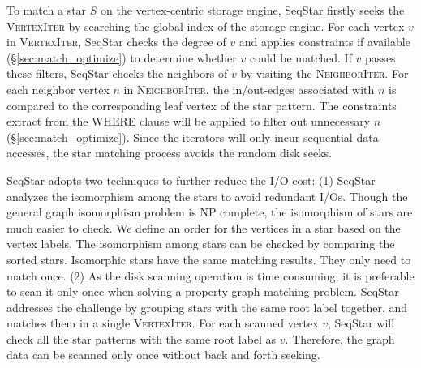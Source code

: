 To match a star $S$ on the vertex-centric storage engine,
SeqStar firstly seeks the \textsc{VertexIter} by searching the global index of the storage engine.
For each vertex $v$ in \textsc{VertexIter},
SeqStar checks the degree of $v$ and applies constraints if available (\S\ref{sec:match_optimize}) to determine whether $v$ could be matched.
If $v$ passes these filters, SeqStar checks the neighbors of $v$ by visiting the \textsc{NeighborIter}.
For each neighbor vertex $n$ in \textsc{NeighborIter},
the in/out-edges associated with $n$ is compared to the corresponding leaf vertex of the star pattern.
The constraints extract from the WHERE clause will be applied to filter out unnecessary $n$ (\S\ref{sec:match_optimize}).
Since the iterators will only incur sequential data accesses,
the star matching process avoids the random disk seeks.

SeqStar adopts two techniques to further reduce the I/O cost:
(1) SeqStar analyzes the isomorphism among the stars to avoid redundant I/Os.
Though the general graph isomorphism problem is NP complete, the isomorphism of stars are much easier to check.
We define an order for the vertices in a star based on the vertex labels. The isomorphism among stars can be checked by comparing the sorted stars.
Isomorphic stars have the same matching results. They only need to match once.
(2) As the disk scanning operation is time consuming, it is preferable to scan it only once when solving a property graph matching problem.
SeqStar addresses the challenge by grouping stars with the same root label together,
and matches them in a single \textsc{VertexIter}.
For each scanned vertex $v$, SeqStar will check all the star patterns with the same root label as $v$.
Therefore, the graph data can be scanned only once without back and forth seeking.

